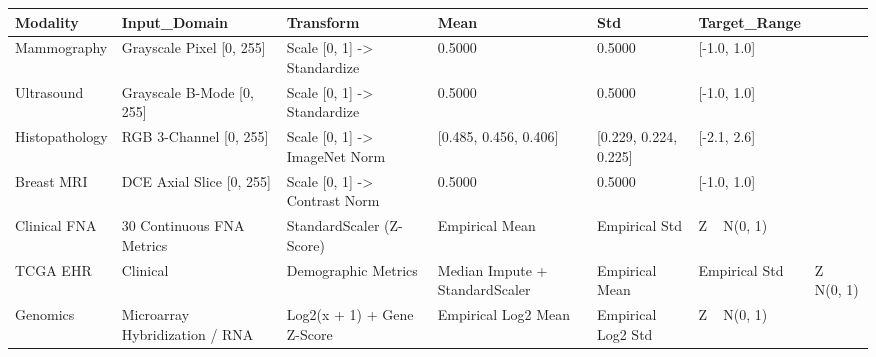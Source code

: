 \begin{tabular}{llllll}
\toprule
Modality & Input_Domain & Transform & Mean & Std & Target_Range \\
\midrule
Mammography & Grayscale Pixel [0, 255] & Scale [0, 1] -> Standardize & 0.5000 & 0.5000 & [-1.0, 1.0] \\
Ultrasound & Grayscale B-Mode [0, 255] & Scale [0, 1] -> Standardize & 0.5000 & 0.5000 & [-1.0, 1.0] \\
Histopathology & RGB 3-Channel [0, 255] & Scale [0, 1] -> ImageNet Norm & [0.485, 0.456, 0.406] & [0.229, 0.224, 0.225] & [-2.1, 2.6] \\
Breast MRI & DCE Axial Slice [0, 255] & Scale [0, 1] -> Contrast Norm & 0.5000 & 0.5000 & [-1.0, 1.0] \\
Clinical FNA & 30 Continuous FNA Metrics & StandardScaler (Z-Score) & Empirical Mean & Empirical Std & Z ~ N(0, 1) \\
TCGA EHR & Clinical & Demographic Metrics & Median Impute + StandardScaler & Empirical Mean & Empirical Std & Z ~ N(0, 1) \\
Genomics & Microarray Hybridization / RNA & Log2(x + 1) + Gene Z-Score & Empirical Log2 Mean & Empirical Log2 Std & Z ~ N(0, 1) \\
\bottomrule
\end{tabular}
